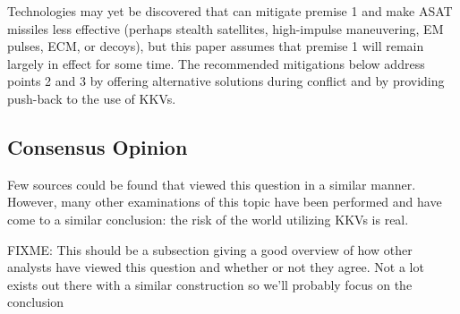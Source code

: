 Technologies may yet be discovered that can mitigate premise 1 and
make ASAT missiles less effective (perhaps stealth satellites,
high-impulse maneuvering, EM pulses, ECM, or decoys), but this paper
assumes that premise 1 will remain largely in effect for some time.
The recommended mitigations below address points 2 and 3 by offering
alternative solutions during conflict and by providing push-back to
the use of KKVs.

\subsection{Consensus Opinion}

Few sources could be found that viewed this question in a similar
manner.  However, many other examinations of this topic have been
performed and have come to a similar conclusion: the risk of the world
utilizing KKVs is real.

FIXME: This should be a subsection giving a good overview of how other
analysts have viewed this question and whether or not they agree.  Not
a lot exists out there with a similar construction so we'll probably
focus on the conclusion

